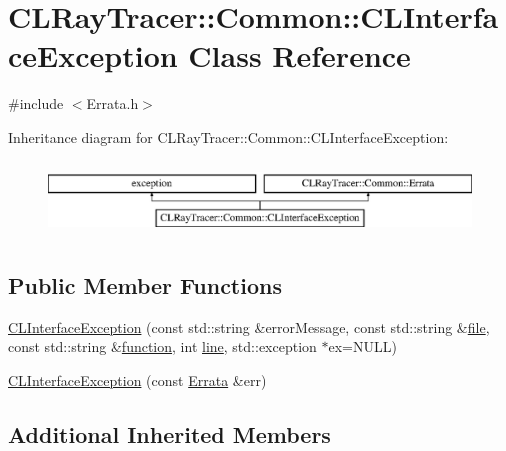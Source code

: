 \hypertarget{class_c_l_ray_tracer_1_1_common_1_1_c_l_interface_exception}{}\section{C\+L\+Ray\+Tracer\+:\+:Common\+:\+:C\+L\+Interface\+Exception Class Reference}
\label{class_c_l_ray_tracer_1_1_common_1_1_c_l_interface_exception}


{\ttfamily \#include $<$Errata.\+h$>$}

Inheritance diagram for C\+L\+Ray\+Tracer\+:\+:Common\+:\+:C\+L\+Interface\+Exception\+:\begin{figure}[H]
\begin{center}
\leavevmode
\includegraphics[height=2.000000cm]{class_c_l_ray_tracer_1_1_common_1_1_c_l_interface_exception}
\end{center}
\end{figure}
\subsection*{Public Member Functions}
\begin{DoxyCompactItemize}
\item 
\hyperlink{class_c_l_ray_tracer_1_1_common_1_1_c_l_interface_exception_a9d5f6bb82221341eb9ac7288d32af05b}{C\+L\+Interface\+Exception} (const std\+::string \&error\+Message, const std\+::string \&\hyperlink{class_c_l_ray_tracer_1_1_common_1_1_errata_ab02c644698211e5b40a9eb8504c4ebfa}{file}, const std\+::string \&\hyperlink{class_c_l_ray_tracer_1_1_common_1_1_errata_ac591fef29757e5309cefa5f96e2f647f}{function}, int \hyperlink{class_c_l_ray_tracer_1_1_common_1_1_errata_ae53b458949d7a8b1438f72086dee9d6d}{line}, std\+::exception $\ast$ex=N\+U\+LL)
\item 
\hyperlink{class_c_l_ray_tracer_1_1_common_1_1_c_l_interface_exception_a6cc2e89ab7ff12ace94e1ccc5678ca9d}{C\+L\+Interface\+Exception} (const \hyperlink{class_c_l_ray_tracer_1_1_common_1_1_errata}{Errata} \&err)
\end{DoxyCompactItemize}
\subsection*{Additional Inherited Members}


